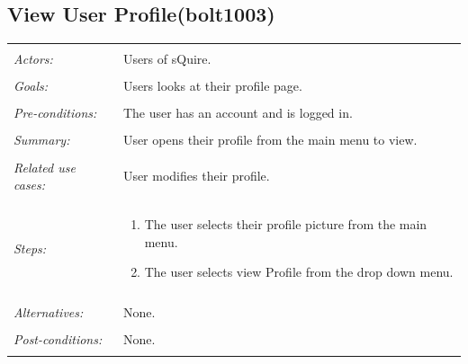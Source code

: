 \documentclass[11pt]{report}
\begin{document}
\begin{IDE-like Features}
\begin{}
\begin{Collaborative features that would be "nice":}
\subsection{View User Profile(bolt1003)}
\begin{tabular}{ p{2cm} p{12cm} }
 \hline
 \\
 \textit{Actors:} & Users of sQuire. \\ 
 \\
 \textit{Goals:} & Users looks at their profile page. \\
 \\
 \textit{Pre-conditions:} & The user has an account and is logged in. \\
 \\
 \textit{Summary:} & User opens their profile from the main menu to view.\\ 
 \\
 \textit{Related use cases:} & User modifies their profile. \\ 
 \\
 \textit{Steps:} & \begin{enumerate}
  \item The user selects their profile picture from the main menu.
  \item The user selects view Profile from the drop down menu.
 \end{enumerate} \\
 \\
 \textit{Alternatives:} & None. \\
 \\
 \textit{Post-conditions:} & None. \\
 \\
\hline
\end{tabular}


\end{Collaborative features that would be "nice":}
\end{}
\end{IDE-like Features}
\end{document}
